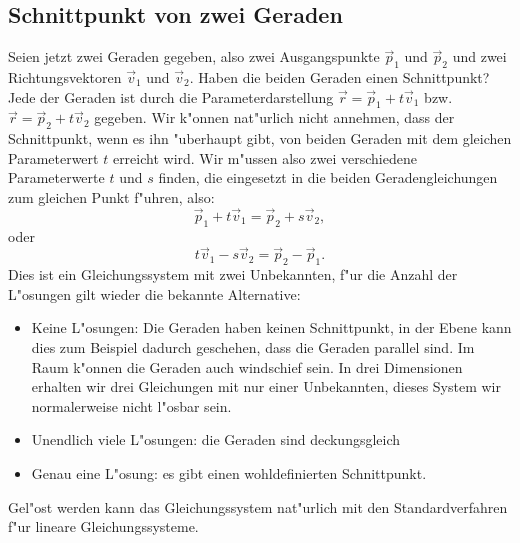 \subsection{Schnittpunkt von zwei Geraden}
Seien jetzt zwei Geraden gegeben, also zwei Ausgangspunkte $\vec p_1$ und
$\vec p_2$ und zwei Richtungsvektoren $\vec v_1$ und $\vec v_2$. Haben die
beiden Geraden einen Schnittpunkt?
Jede der Geraden ist durch die Parameterdarstellung
$\vec r=\vec p_1+t\vec v_1$
bzw.~$\vec r=\vec p_2+t\vec v_2$
gegeben. Wir k"onnen nat"urlich nicht annehmen, dass der Schnittpunkt,
wenn es ihn "uberhaupt gibt, von beiden Geraden mit dem gleichen Parameterwert
$t$ erreicht wird. Wir m"ussen also zwei verschiedene Parameterwerte $t$
und $s$ finden, die eingesetzt in die beiden Geradengleichungen zum gleichen
Punkt f"uhren, also:
\[
\vec p_1+t\vec v_1=\vec p_2+s\vec v_2,
\]
oder
\[
t\vec v_1-s\vec v_2=\vec p_2-\vec p_1.
\]
Dies ist ein Gleichungssystem mit zwei Unbekannten, f"ur die Anzahl der L"osungen
gilt wieder die bekannte Alternative:
\begin{itemize}
\item Keine L"osungen: Die Geraden haben keinen Schnittpunkt, in der Ebene 
kann dies zum Beispiel dadurch geschehen, dass die Geraden parallel sind.
Im Raum k"onnen die Geraden auch windschief sein. In drei Dimensionen
erhalten wir drei Gleichungen mit nur einer Unbekannten, dieses System wir
normalerweise nicht l"osbar sein.
\item Unendlich viele L"osungen: die Geraden sind deckungsgleich
\item Genau eine L"osung: es gibt einen wohldefinierten Schnittpunkt.
\end{itemize}
Gel"ost werden kann das Gleichungssystem nat"urlich mit den Standardverfahren
f"ur lineare Gleichungssysteme.

